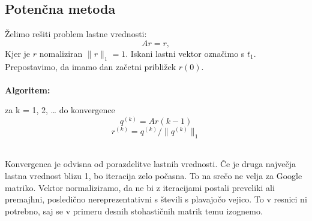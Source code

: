 \documentclass[a4paper]{article}
\begin{document}
\subsection{Potenčna metoda}
Želimo rešiti problem lastne vrednosti:
$$Ar = r,$$
Kjer je $r$ nomaliziran $\|r\|_1=1$. Iskani lastni vektor označimo s $t_1$. \\
Prepostavimo, da imamo dan začetni približek $r{(0)}$. \\
\\
\textbf{Algoritem:} \\
\begin{center} za k = 1, 2, … do konvergence
	$$q^{(k)} = Ar{(k-1)}$$ 
	$$r^{(k)} = q^{(k)}/ \|q^{(k)}\|_1$$ \\
\end{center}
Konvergenca je odvisna od porazdelitve lastnih vrednosti. Če je druga največja lastna vrednost blizu 1, bo iteracija zelo počasna. To na srečo ne velja za Google matriko. Vektor normaliziramo, da ne bi z iteracijami postali preveliki ali premajhni, posledično nereprezentativni s števili s plavajočo vejico. To v resnici ni potrebno, saj se v primeru desnih stohastičnih matrik temu izognemo.
\end{document}
